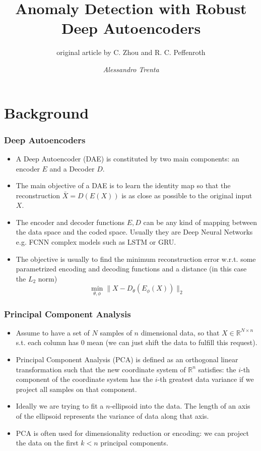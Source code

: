\documentclass{beamer}
\title[Anomaly Detection with Robust Deep Autoencoders]{Anomaly Detection with Robust Deep Autoencoders} %
\subtitle[]{original article by C. Zhou and R. C. Peffenroth}
\author[Alessandro Trenta]{\emph{Alessandro Trenta}} %
\institute[SNS] %
{Scuola Normale Superiore \\ %
}
\date{} %
\theoremstyle{plain}
\theoremstyle{definition}
\theoremstyle{remark}
\newcommand{\R}{\mathbb{R}}
\newcommand{\norm}[1]{\lVert#1\rVert}
\begin{document}
\begin{frame}
	\titlepage %
\end{frame}

\begin{frame}
	\tableofcontents
\end{frame}

\nocite{RAE}

\section{Background}

\begin{frame}
	\frametitle{Deep Autoencoders}
	\begin{itemize}
		\item A Deep Autoencoder (DAE) is constituted by two main components: an encoder $E$ and a Decoder $D$.
		\item The main objective of a DAE is to learn the identity map so that the reconstruction $\bar{X}=D(E(X))$ is as close as possible to the original input $X$.
		\item The encoder and decoder functions $E, D$ can be any kind of mapping between the data space and the coded space. Usually they are Deep Neural Networks e.g. FCNN complex models such as LSTM or GRU.
		\item The objective is usually to find the minimum reconstruction error w.r.t. some parametrized encoding and decoding functions and a distance (in this case the $L_2$ norm)
			\begin{equation}
				\min_{\theta, \phi}{\norm{X-D_{\theta}(E_{\phi}(X))}_{2}}
			\end{equation}
	\end{itemize}
\end{frame}

\begin{frame}
	\frametitle{Principal Component Analysis}
	\begin{itemize}
		\item Assume to have a set of $N$ samples of $n$ dimensional data, so that $X\in \R^{N\times n}$ s.t. each column has $0$ mean (we can just shift the data to fulfill this request).
		\item Principal Component Analysis (PCA) is defined as an orthogonal linear transformation such that the new coordinate system of $\R^{n}$ satisfies: 
			the $i$-th component of the coordinate system has the $i$-th greatest data variance if we project all samples on that component.
		\item Ideally we are trying to fit a $n$-ellipsoid into the data. The length of an axis of the ellipsoid represents the variance of data along that axis.
		\item PCA is often used for dimensionality reduction or encoding: we can project the data on the first $k<n$ principal components.
	\end{itemize}
\end{frame}
\end{document}
